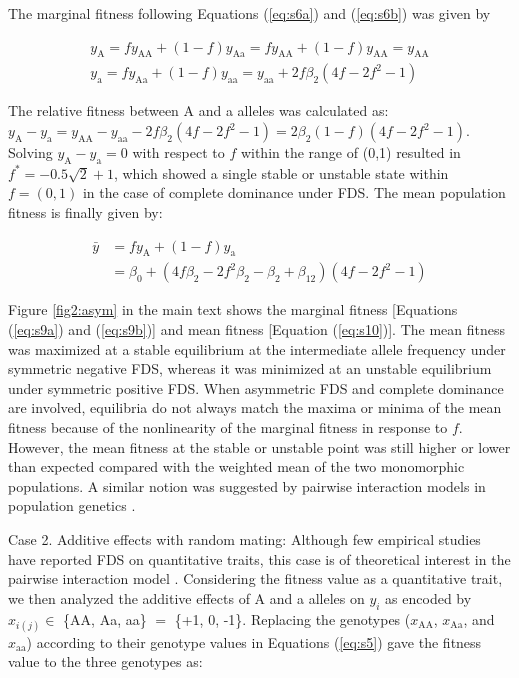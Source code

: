 \documentclass[12pt,]{article}
\begin{document}
\noindent
The marginal fitness following Equations (\ref{eq:s6a}) and (\ref{eq:s6b}) was given by 

\begin{subequations}
\begin{align}
y_\mathrm{A} = fy_\mathrm{AA} + (1-f)y_\mathrm{Aa} = fy_\mathrm{AA} + (1-f)y_\mathrm{AA} = y_\mathrm{AA} \label{eq:s9a} \\
y_\mathrm{a} = fy_\mathrm{Aa} + (1-f)y_\mathrm{aa} = y_\mathrm{aa} + 2f\beta_2(4f-2f^2-1) \label{eq:s9b}
\end{align}
\end{subequations}

\noindent
The relative fitness between A and a alleles was calculated as: $y_\mathrm{A} - y_\mathrm{a} = y_\mathrm{AA} - y_\mathrm{aa} - 2f\beta_2(4f-2f^2-1) = 2\beta_2(1-f)(4f-2f^2-1)$. Solving $y_\mathrm{A} - y_\mathrm{a} = 0$ with respect to $f$ within the range of (0,1) resulted in $f^*=-0.5\sqrt{2}+1$, which showed a single stable or unstable state within $f=(0,1)$ in the case of complete dominance under FDS. The mean population fitness is finally given by:

\begin{equation}
\begin{split}
\bar{y} &= fy_\mathrm{A} + (1-f)y_\mathrm{a} \\
&= \beta_0 + (4f\beta_2-2f^2\beta_2-\beta_2+\beta_{12})(4f-2f^2-1) \label{eq:s10}
\end{split}
\end{equation}

\noindent
Figure \ref{fig2:asym} in the main text shows the marginal fitness [Equations (\ref{eq:s9a}) and (\ref{eq:s9b})] and mean fitness [Equation (\ref{eq:s10})]. The mean fitness was maximized at a stable equilibrium at the intermediate allele frequency under symmetric negative FDS, whereas it was minimized at an unstable equilibrium under symmetric positive FDS. When asymmetric FDS and complete dominance are involved, equilibria do not always match the maxima or minima of the mean fitness because of the nonlinearity of the marginal fitness in response to $f$. However, the mean fitness at the stable or unstable point was still higher or lower than expected compared with the weighted mean of the two monomorphic populations. A similar notion was suggested by pairwise interaction models in population genetics \citep{cockerham1972frequency, schneider_maximization_2008}.

Case 2. Additive effects with random mating: Although few empirical studies have reported FDS on quantitative traits, this case is of theoretical interest in the pairwise interaction model \citep{schneider_maximization_2008}. Considering the fitness value as a quantitative trait, we then analyzed the additive effects of A and a alleles on $y_i$ as encoded by $x_{i(j)} \in $ \{AA, Aa, aa\} $=$ \{+1, 0, -1\}. Replacing the genotypes ($x_\mathrm{AA}$, $x_\mathrm{Aa}$, and $x_\mathrm{aa}$) according to their genotype values in Equations (\ref{eq:s5}) gave the fitness value to the three genotypes as:
\end{document}
